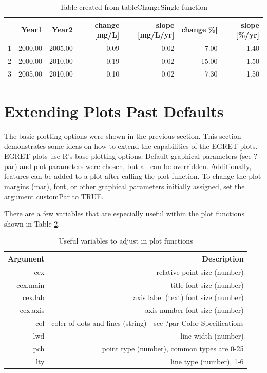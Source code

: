 \documentclass[a4paper,11pt]{article}\usepackage{graphicx, color}
\begin{document}
\begin{table}[ht]
\centering
\begin{tabular}{rrrrrrr}
  \hline
 & Year1 & Year2 & change [mg/L] & slope [mg/L/yr] & change[\%] & slope [\%/yr] \\ 
  \hline
1 & 2000.00 & 2005.00 & 0.09 & 0.02 & 7.00 & 1.40 \\ 
  2 & 2000.00 & 2010.00 & 0.19 & 0.02 & 15.00 & 1.50 \\ 
  3 & 2005.00 & 2010.00 & 0.10 & 0.02 & 7.30 & 1.50 \\ 
   \hline
\end{tabular}
\caption{Table created from tableChangeSingle function} 
\label{table:tableChangeSingle}
\end{table}


\clearpage

\FloatBarrier


\section{Extending Plots Past Defaults}
\label{sec:extendedPlots}

\FloatBarrier

The basic plotting options were shown in the previous section.  This section demonstrates some ideas on how to extend the capabilities of the EGRET plots. EGRET plots use R's base plotting options. Default graphical parameters (see ?par) and plot parameters were chosen, but all can be overridden. Additionally, features can be added to a plot after calling the plot function. To change the plot margins (mar), font, or other graphical parameters initially assigned, set the argument customPar to TRUE.

There are a few variables that are especially useful within the plot functions shown in Table \ref{table:tableChangeSingle}.

\begin{table}[ht]
\centering
\begin{tabular}{rr}
  \hline
Argument & Description  \\ 
  \hline
cex &  relative point size (number) \\ 
cex.main &  title font size (number) \\ 
cex.lab &  axis label (text) font size (number) \\ 
cex.axis & axis number font size (number) \\
col & coler of dots and lines (string) - see ?par Color Specifications\\
lwd & line width (number)\\
pch & point type (number), common types are 0-25\\
lty & line type (number), 1-6\\
   \hline
\end{tabular}
\caption{Useful variables to adjust in plot functions} 
\label{table:tableChangeSingle}
\end{table}
\end{document}
